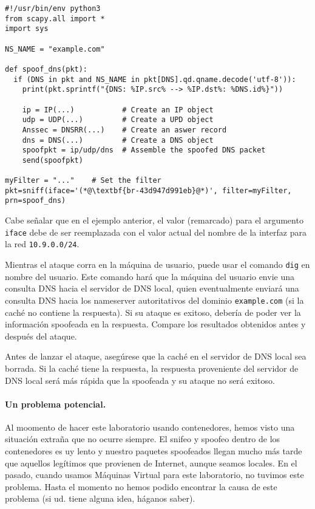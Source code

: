 \begin{lstlisting}
#!/usr/bin/env python3
from scapy.all import *
import sys

NS_NAME = "example.com"

def spoof_dns(pkt):
  if (DNS in pkt and NS_NAME in pkt[DNS].qd.qname.decode('utf-8')):
    print(pkt.sprintf("{DNS: %IP.src% --> %IP.dst%: %DNS.id%}"))

    ip = IP(...)           # Create an IP object
    udp = UDP(...)         # Create a UPD object
    Anssec = DNSRR(...)    # Create an aswer record
    dns = DNS(...)         # Create a DNS object
    spoofpkt = ip/udp/dns  # Assemble the spoofed DNS packet
    send(spoofpkt)

myFilter = "..."    # Set the filter
pkt=sniff(iface='(*@\textbf{br-43d947d991eb}@*)', filter=myFilter, prn=spoof_dns)
\end{lstlisting}

Cabe señalar que en el ejemplo anterior, el valor (remarcado) para el argumento \texttt{iface} debe de ser reemplazada con el valor actual del nombre de la interfaz para la red \texttt{10.9.0.0/24}.

Mientras el ataque corra en la máquina de usuario, puede usar el comando \texttt{dig} en nombre del usuario.
Este comando hará que la máquina del usuario envie una consulta DNS hacia el servidor de DNS local, quien eventualmente enviará una consulta DNS hacia los nameserver autoritativos del dominio \texttt{example.com} (si la caché no contiene la respuesta).
Si su ataque es exitoso, debería de poder ver la información spoofeada en la respuesta. Compare los resultados obtenidos antes y después del ataque.
 
Antes de lanzar el ataque, asegúrese que la caché en el servidor de DNS local sea borrada. Si la caché tiene la respuesta, la respuesta proveniente del servidor de DNS local será más rápida que la spoofeada y su ataque no será exitoso.


\paragraph{Un problema potencial.} Al moomento de hacer este laboratorio usando contenedores, hemos visto una situación extraña que no ocurre siempre. El snifeo y spoofeo dentro de los contenedores es uy lento y nuestro paquetes spoofeados llegan mucho más tarde que aquellos legítimos que provienen de Internet, aunque seamos locales. En el pasado, cuando usamos Máquinas Virtual para este laboratorio, no tuvimos este problema. Hasta el momento no hemos podido encontrar la causa de este problema (si ud. tiene alguna idea, háganos saber).

